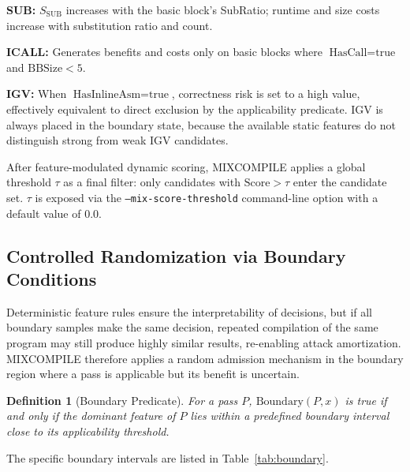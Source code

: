 \documentclass[pdflatex,sn-mathphys-num]{sn-jnl}
\theoremstyle{thmstyleone}%
\theoremstyle{thmstyletwo}%
\theoremstyle{thmstylethree}%
\newtheorem{definition}{Definition}%
\begin{document}
\textbf{SUB:} $S_{\text{SUB}}$ increases with the basic block's SubRatio; runtime and
size costs increase with substitution ratio and count.

\textbf{ICALL:} Generates benefits and costs only on basic blocks where
$\text{HasCall} = \text{true}$ and $\text{BBSize} < 5$.

\textbf{IGV:} When $\text{HasInlineAsm} = \text{true}$, correctness risk is set to a
high value, effectively equivalent to direct exclusion by the applicability predicate.
IGV is always placed in the boundary state, because the available static features do
not distinguish strong from weak IGV candidates.

After feature-modulated dynamic scoring, MIXCOMPILE applies a global threshold $\tau$
as a final filter: only candidates with $\text{Score} > \tau$ enter the candidate set.
$\tau$ is exposed via the \texttt{--mix-score-threshold} command-line option with a
default value of 0.0.

\subsection{Controlled Randomization via Boundary Conditions}
\label{sec:boundary}

Deterministic feature rules ensure the interpretability of decisions, but if all
boundary samples make the same decision, repeated compilation of the same program may
still produce highly similar results, re-enabling attack amortization. MIXCOMPILE
therefore applies a random admission mechanism in the boundary region where a pass is
applicable but its benefit is uncertain.

\begin{definition}[Boundary Predicate]
For a pass $P$, $\text{Boundary}(P, x)$ is true if and only if the dominant feature of
$P$ lies within a predefined boundary interval close to its applicability threshold.
\end{definition}

The specific boundary intervals are listed in Table~\ref{tab:boundary}.
\end{document}

